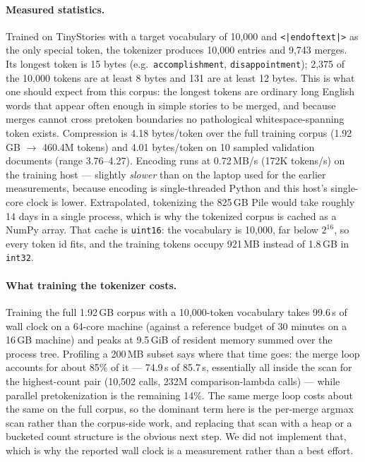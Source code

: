 \documentclass{article}
\newcommand{\eot}{\texttt{<|endoftext|>}}
\begin{document}
\paragraph{Measured statistics.} Trained on TinyStories \citep{tinystories} with a target vocabulary of 10{,}000 and \eot{} as the only special token, the tokenizer produces 10{,}000 entries and 9{,}743 merges. Its longest token is 15 bytes (e.g.\ \texttt{\textvisiblespace{}accomplishment}, \texttt{\textvisiblespace{}disappointment}); 2{,}375 of the 10{,}000 tokens are at least 8 bytes and 131 are at least 12 bytes. This is what one should expect from this corpus: the longest tokens are ordinary long English words that appear often enough in simple stories to be merged, and because merges cannot cross pretoken boundaries no pathological whitespace-spanning token exists. Compression is 4.18 bytes/token over the full training corpus (1.92\,GB $\rightarrow$ 460.4M tokens) and 4.01 bytes/token on 10 sampled validation documents (range 3.76--4.27). Encoding runs at 0.72\,MB/s (172K tokens/s) on the training host --- slightly \emph{slower} than on the laptop used for the earlier measurements, because encoding is single-threaded Python and this host's single-core clock is lower. Extrapolated, tokenizing the 825\,GB Pile \citep{pile} would take roughly 14 days in a single process, which is why the tokenized corpus is cached as a NumPy array. That cache is \texttt{uint16}: the vocabulary is 10{,}000, far below $2^{16}$, so every token id fits, and the training tokens occupy 921\,MB instead of 1.8\,GB in \texttt{int32}.

\paragraph{What training the tokenizer costs.} Training the full 1.92\,GB corpus with a 10{,}000-token vocabulary takes 99.6\,s of wall clock on a 64-core machine (against a reference budget of 30 minutes on a 16\,GB machine) and peaks at 9.5\,GiB of resident memory summed over the process tree. Profiling a 200\,MB subset says where that time goes: the merge loop accounts for about 85\% of it --- 74.9\,s of 85.7\,s, essentially all inside the scan for the highest-count pair (10{,}502 calls, 232M comparison-lambda calls) --- while parallel pretokenization is the remaining 14\%. The same merge loop costs about the same on the full corpus, so the dominant term here is the per-merge argmax scan rather than the corpus-side work, and replacing that scan with a heap or a bucketed count structure is the obvious next step. We did not implement that, which is why the reported wall clock is a measurement rather than a best effort.
\end{document}
